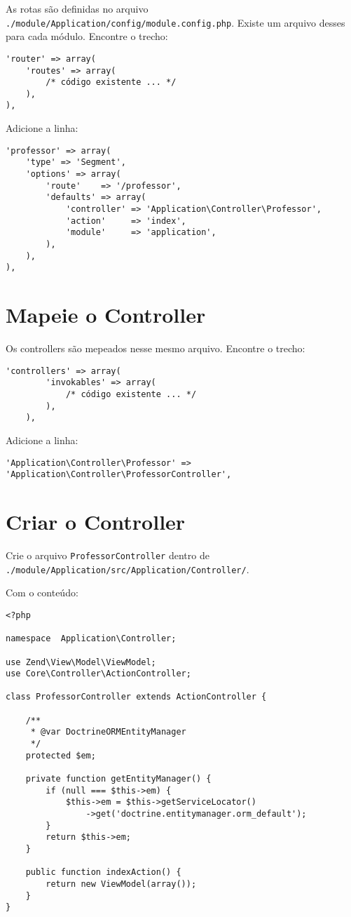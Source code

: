 As rotas são definidas no arquivo
\texttt{./module/Application/config/module.config.php}. Existe um
arquivo desses para cada módulo. Encontre o trecho:

\begin{verbatim}
'router' => array(
    'routes' => array(
        /* código existente ... */
    ),
),
\end{verbatim}

Adicione a linha:

\begin{verbatim}
'professor' => array(
    'type' => 'Segment',
    'options' => array(
        'route'    => '/professor',
        'defaults' => array(
            'controller' => 'Application\Controller\Professor',
            'action'     => 'index',
            'module'     => 'application',
        ),
    ),
),
\end{verbatim}

\section{Mapeie o Controller}\label{mapeie-o-controller}

Os controllers são mepeados nesse mesmo arquivo. Encontre o trecho:

\begin{verbatim}
'controllers' => array(
        'invokables' => array(
            /* código existente ... */
        ),
    ),
\end{verbatim}

Adicione a linha:

\begin{verbatim}
'Application\Controller\Professor' => 'Application\Controller\ProfessorController',
\end{verbatim}

\section{Criar o Controller}\label{criar-o-controller}

Crie o arquivo \texttt{ProfessorController} dentro de
\texttt{./module/Application/src/Application/Controller/}.

Com o conteúdo:

\begin{verbatim}
<?php

namespace  Application\Controller;

use Zend\View\Model\ViewModel;
use Core\Controller\ActionController;

class ProfessorController extends ActionController {

    /**
     * @var DoctrineORMEntityManager
     */
    protected $em;
    
    private function getEntityManager() {
        if (null === $this->em) {
            $this->em = $this->getServiceLocator()
                ->get('doctrine.entitymanager.orm_default');
        }
        return $this->em;
    }
    
    public function indexAction() {
        return new ViewModel(array());
    }
}
\end{verbatim}


